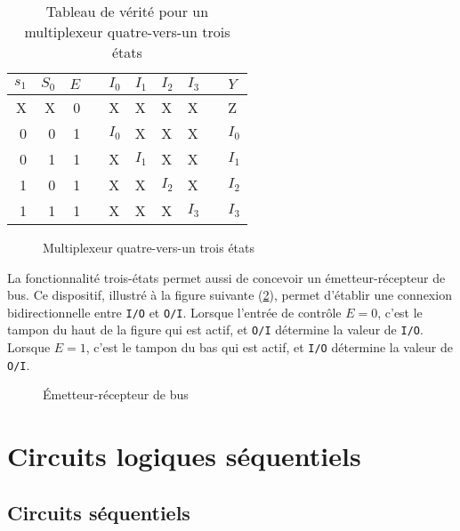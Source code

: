 \documentclass[letter, oneside]{book}
\begin{document}
\begin{table}[htbp]
\caption{\label{tab:orga06483d}Tableau de vérité pour un  multiplexeur quatre-vers-un trois états}
\centering
\begin{tabular}{rrrlllllll}
\(s_1\) & \(S_0\) & \(E\) &  & \(I_0\) & \(I_1\) & \(I_2\) & \(I_3\) &  & \(Y\)\\[0pt]
\hline
X & X & 0 &  & X & X & X & X &  & Z\\[0pt]
0 & 0 & 1 &  & \(I_0\) & X & X & X &  & \(I_0\)\\[0pt]
0 & 1 & 1 &  & X & \(I_1\) & X & X &  & \(I_1\)\\[0pt]
1 & 0 & 1 &  & X & X & \(I_2\) & X &  & \(I_2\)\\[0pt]
1 & 1 & 1 &  & X & X & X & \(I_3\) &  & \(I_3\)\\[0pt]
\end{tabular}
\end{table}


\begin{figure}[htbp]
\centering

\caption{\label{fig:org44e8d27}Multiplexeur quatre-vers-un trois états}
\end{figure}

La fonctionnalité trois-états permet aussi de concevoir un
émetteur-récepteur de bus. Ce dispositif, illustré à la figure
suivante (\ref{fig:org377ea05}), permet d'établir une connexion
bidirectionnelle entre \texttt{I/O} et \texttt{O/I}. Lorsque l'entrée de contrôle
\(E = 0\), c'est le tampon du haut de la figure qui est actif, et
\texttt{O/I} détermine la valeur de \texttt{I/O}. Lorsque \(E = 1\), c'est le tampon
du bas qui est actif, et \texttt{I/O} détermine la valeur de \texttt{O/I}.

\begin{figure}[htbp]
\centering

\caption{\label{fig:org377ea05}Émetteur-récepteur de bus}
\end{figure}


\part{Circuits logiques séquentiels}
\label{sec:org202e362}
\chapter{Circuits séquentiels}
\label{sec:orga2eee1a}
\end{document}
